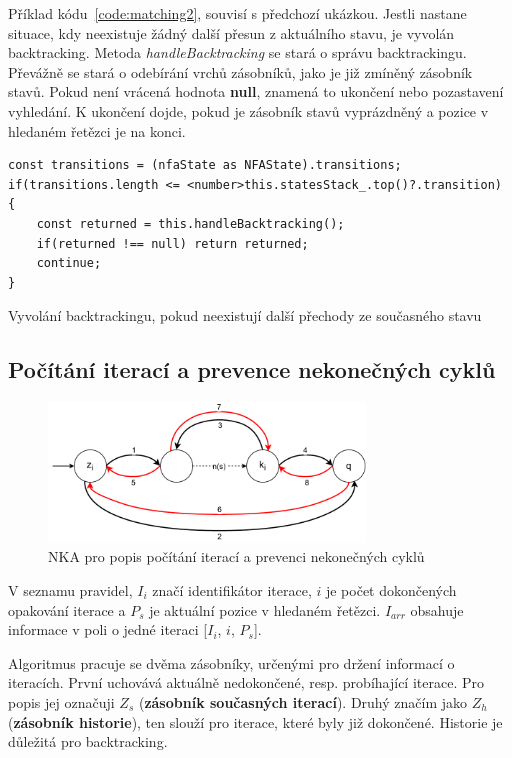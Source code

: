 Příklad kódu~\ref{code:matching2}, souvisí s předchozí ukázkou. 
Jestli nastane situace, kdy neexistuje žádný další přesun z aktuálního stavu, je vyvolán backtracking.
Metoda \textit{handleBacktracking} se stará o správu backtrackingu.
Převážně se stará o odebírání vrchů zásobníků, jako je již zmíněný zásobník stavů.
Pokud není vrácená hodnota \textbf{null}, znamená to ukončení nebo pozastavení vyhledání.
K ukončení dojde, pokud je zásobník stavů vyprázdněný a pozice v hledaném řetězci je na konci.

\begin{code}[!ht]
	\begin{verbatim}
const transitions = (nfaState as NFAState).transitions;
if(transitions.length <= <number>this.statesStack_.top()?.transition)
{
	const returned = this.handleBacktracking();
	if(returned !== null) return returned;
	continue;
}
	\end{verbatim}
	\caption{Vyvolání backtrackingu, pokud neexistují další přechody ze současného stavu}
	\label{code:matching2}
\end{code}

\newpage

\subsection*{Počítání iterací a prevence nekonečných cyklů}

\begin{figure}[!h]
	\centering
	\includegraphics[width=0.75\textwidth]{Figures/IterationCount.pdf}
	\caption{NKA pro popis počítání iterací a prevenci nekonečných cyklů}
	\label{fig:ITERCNT}
\end{figure}

V seznamu pravidel, $I_i$ značí identifikátor iterace, $i$ je počet dokončených opakování iterace a $P_s$ je aktuální pozice v hledaném řetězci.
$I_{arr}$ obsahuje informace v poli o jedné iteraci [$I_i$, $i$, $P_s$].

Algoritmus pracuje se dvěma zásobníky, určenými pro držení informací o iteracích. 
První uchovává aktuálně nedokončené, resp. probíhající iterace. 
Pro popis jej označuji $Z_s$ (\textbf{zásobník současných iterací}).
Druhý značím jako $Z_h$ (\textbf{zásobník historie}), ten slouží pro iterace, které byly již dokončené.
Historie je důležitá pro backtracking.

